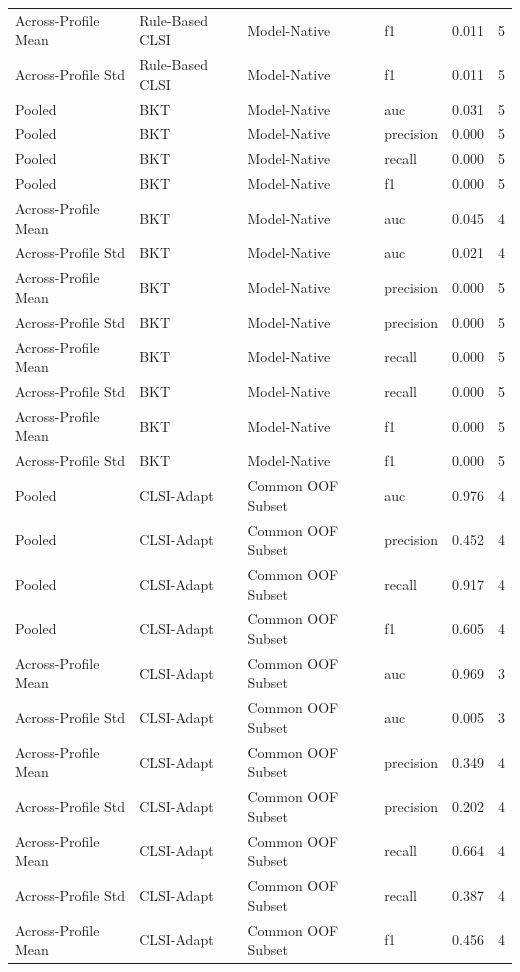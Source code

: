 \begin{table}[ht]
\begin{tabular}{llllll}
Across-Profile Mean & Rule-Based CLSI & Model-Native & f1 & 0.011 & 5 \\
Across-Profile Std & Rule-Based CLSI & Model-Native & f1 & 0.011 & 5 \\
Pooled & BKT & Model-Native & auc & 0.031 & 5 \\
Pooled & BKT & Model-Native & precision & 0.000 & 5 \\
Pooled & BKT & Model-Native & recall & 0.000 & 5 \\
Pooled & BKT & Model-Native & f1 & 0.000 & 5 \\
Across-Profile Mean & BKT & Model-Native & auc & 0.045 & 4 \\
Across-Profile Std & BKT & Model-Native & auc & 0.021 & 4 \\
Across-Profile Mean & BKT & Model-Native & precision & 0.000 & 5 \\
Across-Profile Std & BKT & Model-Native & precision & 0.000 & 5 \\
Across-Profile Mean & BKT & Model-Native & recall & 0.000 & 5 \\
Across-Profile Std & BKT & Model-Native & recall & 0.000 & 5 \\
Across-Profile Mean & BKT & Model-Native & f1 & 0.000 & 5 \\
Across-Profile Std & BKT & Model-Native & f1 & 0.000 & 5 \\
Pooled & CLSI-Adapt & Common OOF Subset & auc & 0.976 & 4 \\
Pooled & CLSI-Adapt & Common OOF Subset & precision & 0.452 & 4 \\
Pooled & CLSI-Adapt & Common OOF Subset & recall & 0.917 & 4 \\
Pooled & CLSI-Adapt & Common OOF Subset & f1 & 0.605 & 4 \\
Across-Profile Mean & CLSI-Adapt & Common OOF Subset & auc & 0.969 & 3 \\
Across-Profile Std & CLSI-Adapt & Common OOF Subset & auc & 0.005 & 3 \\
Across-Profile Mean & CLSI-Adapt & Common OOF Subset & precision & 0.349 & 4 \\
Across-Profile Std & CLSI-Adapt & Common OOF Subset & precision & 0.202 & 4 \\
Across-Profile Mean & CLSI-Adapt & Common OOF Subset & recall & 0.664 & 4 \\
Across-Profile Std & CLSI-Adapt & Common OOF Subset & recall & 0.387 & 4 \\
Across-Profile Mean & CLSI-Adapt & Common OOF Subset & f1 & 0.456 & 4 \\

\end{tabular}
\end{table}
